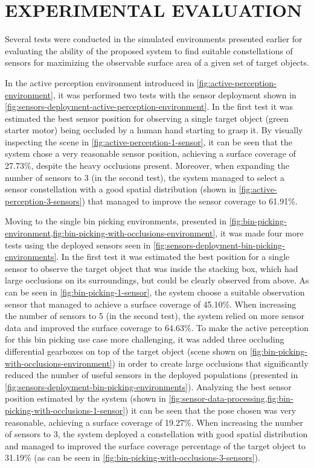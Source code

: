 \section{\uppercase{Experimental evaluation}}\label{sec:results}

\noindent Several tests were conducted in the simulated environments presented earlier for evaluating the ability of the proposed system to find suitable constellations of sensors for maximizing the observable surface area of a given set of target objects.

In the active perception environment introduced in \cref{fig:active-perception-environment}, it was performed two tests with the sensor deployment shown in \cref{fig:sensors-deployment-active-perception-environment}. In the first test it was estimated the best sensor position for observing a single target object (green starter motor) being occluded by a human hand starting to grasp it. By visually inspecting the scene in \cref{fig:active-perception-1-sensor}, it can be seen that the system chose a very reasonable sensor position, achieving a surface coverage of 27.73\%, despite the heavy occlusions present. Moreover, when expanding the number of sensors to 3 (in the second test), the system managed to select a sensor constellation with a good spatial distribution (shown in \cref{fig:active-perception-3-sensors}) that managed to improve the sensor coverage to 61.91\%.

Moving to the single bin picking environments, presented in \cref{fig:bin-picking-environment,fig:bin-picking-with-occlusions-environment}, it was made four more tests using the deployed sensors seen in \cref{fig:sensors-deployment-bin-picking-environments}. In the first test it was estimated the best position for a single sensor to observe the target object that was inside the stacking box, which had large occlusions on its surroundings, but could be clearly observed from above. As can be seen in \cref{fig:bin-picking-1-sensor}, the system choose a suitable observation sensor that managed to achieve a surface coverage of 45.10\%. When increasing the number of sensors to 5 (in the second test), the system relied on more sensor data and improved the surface coverage to 64.63\%. To make the active perception for this bin picking use case more challenging, it was added three occluding differential gearboxes on top of the target object (scene shown on \cref{fig:bin-picking-with-occlusions-environment}) in order to create large occlusions that significantly reduced the number of useful sensors in the deployed populations (presented in \cref{fig:sensors-deployment-bin-picking-environments}). Analyzing the best sensor position estimated by the system (shown in \cref{fig:sensor-data-processing,fig:bin-picking-with-occlusions-1-sensor}) it can be seen that the pose chosen was very reasonable, achieving a surface coverage of 19.27\%. When increasing the number of sensors to 3, the system deployed a constellation with good spatial distribution and managed to improved the surface coverage percentage of the target object to 31.19\% (as can be seen in \cref{fig:bin-picking-with-occlusions-3-sensors}).

